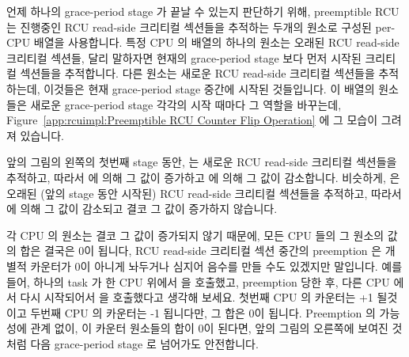 언제 하나의 grace-period stage 가 끝날 수 있는지 판단하기 위해, preemptible RCU
는 진행중인 RCU read-side 크리티컬 섹션들을 추적하는 두개의 원소로 구성된
per-CPU  배열을 사용합니다.
특정 CPU 의  배열의 하나의 원소는 오래된 RCU read-side 크리티컬
섹션들, 달리 말하자면 현재의 grace-period stage 보다 먼저 시작된 크리티컬
섹션들을 추적합니다.
다른 원소는 새로운 RCU read-side 크리티컬 섹션들을 추적하는데, 이것들은 현재
grace-period stage 중간에 시작된 것들입니다.
이 배열의 원소들은 새로운 grace-period stage 각각의 시작 때마다 그 역할을
바꾸는데,
Figure~\ref{app:rcuimpl:Preemptible RCU Counter Flip Operation} 에 그 모습이
그려져 있습니다.

앞의 그림의 왼쪽의 첫번째 stage 동안,  는 새로운 RCU
read-side 크리티컬 섹션들을 추적하고, 따라서  에 의해 그
값이 증가하고  에 의해 그 값이 감소합니다.
비슷하게,  은 오래된 (앞의 stage 동안 시작된) RCU read-side
크리티컬 섹션들을 추적하고, 따라서  에 의해 그 값이
감소되고 결코 그 값이 증가하지 않습니다.

각 CPU 의  원소는 결코 그 값이 증가되지 않기 때문에, 모든
CPU 들의 그 원소의 값의 합은 결국은 0이 됩니다, RCU read-side 크리티컬 섹션
중간의 preemption 은 개별적 카운터가 0이 아니게 놔두거나 심지어 음수를 만들
수도 있겠지만 말입니다.
예를 들어, 하나의 task 가 한 CPU 위에서  을 호출했고,
preemption 당한 후, 다른 CPU 에서 다시 시작되어서  을
호출했다고 생각해 보세요.
첫번째 CPU 의 카운터는 +1 될것이고 두번째 CPU 의 카운터는 -1 됩니다만, 그 합은
0이 됩니다.
Preemption 의 가능성에 관계 없이, 이 카운터 원소들의 합이 0이 된다면, 앞의
그림의 오른쪽에 보여진 것처럼 다음 grace-period stage 로 넘어가도 안전합니다.
\iffalse

